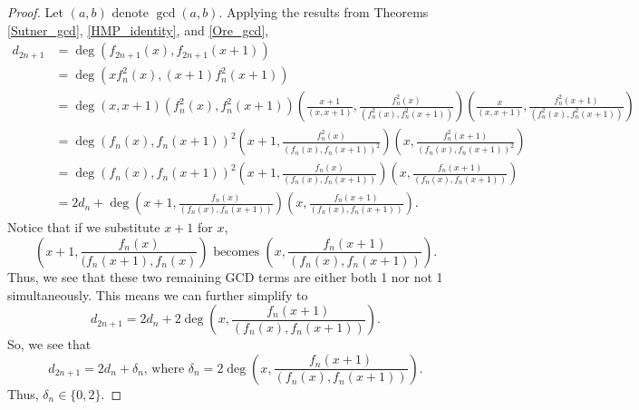 \documentclass[a4paper]{article}
\begin{document}
	\begin{proof}
		Let $(a,b)$ denote $\gcd{(a,b)}$.
		Applying the results from Theorems \ref{Sutner_gcd}, \ref{HMP_identity}, and \ref{Ore_gcd},
		\begin{align*}
			d_{2n+1} &= \deg \left(f_{2n+1}(x), f_{2n+1}(x+1)\right) \\
				&= \deg \left(xf^2_n(x), (x+1)f^2_n(x+1)\right) \\
				&= \deg (x,x+1)\left(f^2_n(x),f^2_n(x+1)\right)\left(\frac{x+1}{(x,x+1)},\frac{f^2_n(x)}{(f^2_n(x),f^2_n(x+1))}\right)\left(\frac{x}{(x,x+1)},\frac{f^2_n(x+1)}{(f^2_n(x),f^2_n(x+1))}\right) \\
				&= \deg \left(f_n(x),f_n(x+1)\right)^2\left(x+1,\frac{f^2_n(x)}{(f_n(x),f_n(x+1))^2}\right)\left(x,\frac{f^2_n(x+1)}{(f_n(x),f_n(x+1))^2}\right) \\
				&= \deg \left(f_n(x),f_n(x+1)\right)^2\left(x+1,\frac{f_n(x)}{(f_n(x),f_n(x+1))}\right)\left(x,\frac{f_n(x+1)}{(f_n(x),f_n(x+1))}\right) \\
				&= 2d_n + \deg\left(x+1,\frac{f_n(x)}{(f_n(x),f_n(x+1))}\right)\left(x,\frac{f_n(x+1)}{(f_n(x),f_n(x+1))}\right).
		\end{align*}
		Notice that if we substitute $x+1$ for $x$,
		\begin{equation*}
			\left(x+1,\frac{f_n(x)}{(f_n(x+1),f_n(x)}\right) \text{ becomes } \left(x,\frac{f_n(x+1)}{(f_n(x),f_n(x+1))}\right).
		\end{equation*}
		Thus, we see that these two remaining GCD terms are either both 1 nor not 1 simultaneously.
		This means we can further simplify to
		\begin{equation*}
			d_{2n+1} = 2d_{n} + 2\deg\left(x,\frac{f_n(x+1)}{(f_n(x),f_n(x+1))}\right).
		\end{equation*}
		So, we see that
		\begin{equation*}
			d_{2n+1} = 2d_{n} + \delta_n \text{, where }\delta_n = 2\deg\left(x,\frac{f_n(x+1)}{(f_n(x),f_n(x+1))}\right).
		\end{equation*}
		Thus, $\delta_n \in \{0,2\}$.
		

\end{proof}
\end{document}
